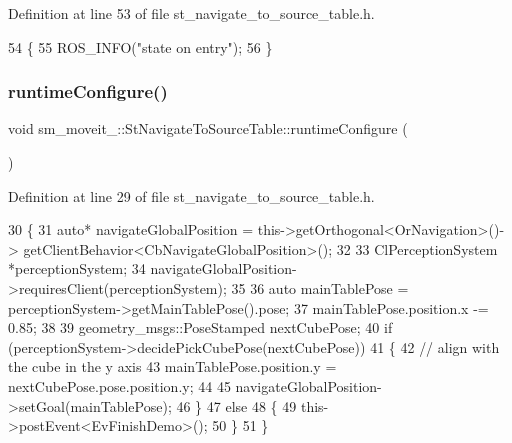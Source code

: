 Definition at line 53 of file st\+\_\+navigate\+\_\+to\+\_\+source\+\_\+table.\+h.


\begin{DoxyCode}
54         \{
55             ROS\_INFO(\textcolor{stringliteral}{"state on entry"});
56         \}
\end{DoxyCode}
\mbox{\label{structsm__moveit__4_1_1StNavigateToSourceTable_a532b64eb7ea6938d22c712e29ecf0ac9}} 
\subsubsection{\texorpdfstring{runtime\+Configure()}{runtimeConfigure()}}
{\footnotesize\ttfamily void sm\+\_\+moveit\+\_\+::\+St\+Navigate\+To\+Source\+Table\+::runtime\+Configure (\begin{DoxyParamCaption}{ }\end{DoxyParamCaption})\hspace{0.3cm}{\ttfamily [inline]}}



Definition at line 29 of file st\+\_\+navigate\+\_\+to\+\_\+source\+\_\+table.\+h.


\begin{DoxyCode}
30         \{
31             \textcolor{keyword}{auto}* navigateGlobalPosition = this->getOrthogonal<OrNavigation>()->
      getClientBehavior<CbNavigateGlobalPosition>();
32             
33             ClPerceptionSystem *perceptionSystem;
34             navigateGlobalPosition->requiresClient(perceptionSystem);
35 
36             \textcolor{keyword}{auto} mainTablePose = perceptionSystem->getMainTablePose().pose;
37             mainTablePose.position.x -= 0.85;
38 
39             geometry\_msgs::PoseStamped nextCubePose;
40             \textcolor{keywordflow}{if} (perceptionSystem->decidePickCubePose(nextCubePose))
41             \{
42                 \textcolor{comment}{// align with the cube in the y axis}
43                 mainTablePose.position.y = nextCubePose.pose.position.y;
44 
45                 navigateGlobalPosition->setGoal(mainTablePose);
46             \}
47             \textcolor{keywordflow}{else}
48             \{
49                 this->postEvent<EvFinishDemo>();
50             \}
51         \}
\end{DoxyCode}
\mbox{\label{structsm__moveit__4_1_1StNavigateToSourceTable_a10d9b17cf7d5450760c13552eb9de0b5}} 
